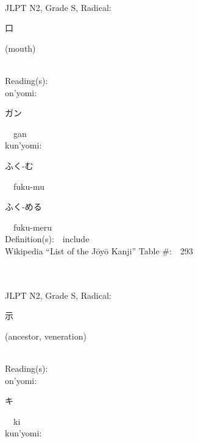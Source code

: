 \begin{multicols}{2}
{\fontsize{34pt}{40pt}  }\ \ \\  %
{JLPT N2, Grade S, Radical:\ \ {\begin{CJK}{UTF8}{min} 口 \end{CJK}} (mouth) } \\
Reading(s):\ \ \\
{\hspace*{1em}}on'yomi:\ \ \\
{\hspace*{2em}}{\begin{CJK}{UTF8}{min} ガン \end{CJK}}\ \ gan\ \ \\
{\hspace*{1em}}kun'yomi:\ \ \\
{\hspace*{2em}}{\begin{CJK}{UTF8}{min} ふく-む \end{CJK}}\ \ fuku-mu\ \ \\
{\hspace*{2em}}{\begin{CJK}{UTF8}{min} ふく-める \end{CJK}}\ \ fuku-meru\ \ \\
Definition(s):\ \ include \\
Wikipedia ``List of the J\=oy\=o Kanji'' Table \#:\ \ 293 \\
\ \ \\
{\fontsize{34pt}{40pt}  }\ \ \\  %
{JLPT N2, Grade S, Radical:\ \ {\begin{CJK}{UTF8}{min} 示 \end{CJK}} (ancestor, veneration) } \\
Reading(s):\ \ \\
{\hspace*{1em}}on'yomi:\ \ \\
{\hspace*{2em}}{\begin{CJK}{UTF8}{min} キ \end{CJK}}\ \ ki\ \ \\
{\hspace*{1em}}kun'yomi:\ \ \\

\end{multicols}
